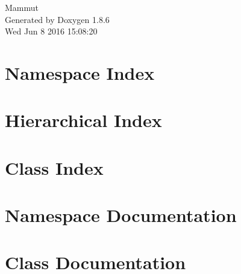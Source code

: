 \documentclass[twoside]{book}
\newcommand{\clearemptydoublepage}{%
  \newpage{\pagestyle{empty}\cleardoublepage}%
}
\begin{document}
\hypersetup{pageanchor=false}
\begin{titlepage}
\vspace*{7cm}
\begin{center}%
{\Large Mammut }\\
\vspace*{1cm}
{\large Generated by Doxygen 1.8.6}\\
\vspace*{0.5cm}
{\small Wed Jun 8 2016 15:08:20}\\
\end{center}
\end{titlepage}
\clearemptydoublepage
\tableofcontents
\clearemptydoublepage
{}
\hypersetup{pageanchor=true}

\chapter{Namespace Index}

\chapter{Hierarchical Index}

\chapter{Class Index}

\chapter{Namespace Documentation}

\chapter{Class Documentation}




















\newpage
{}
{}
\printindex
\end{document}
